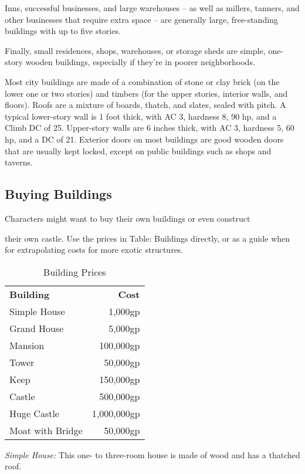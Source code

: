 Inns, successful businesses, and large warehouses -- as well as millers, tanners, 
and other businesses that require extra space -- are generally large, free-standing 
buildings with up to five stories. 

Finally, small residences, shops, warehouses, or storage sheds are simple, one-story 
wooden buildings, especially if they're in poorer neighborhoods.

Most city buildings are made of a combination of stone or clay brick (on the lower 
one or two stories) and timbers (for the upper stories, interior walls, and floors). 
Roofs are a mixture of boards, thatch, and slates, sealed with pitch. A typical 
lower-story wall is 1 foot thick, with AC 3, hardness 8, 90 hp, and a Climb DC 
of 25. Upper-story walls are 6 inches thick, with AC 3, hardness 5, 60 hp, and 
a  DC of 21. Exterior doors on most buildings are good wooden doors that are 
usually kept locked, except on public buildings such as shops and taverns.

\subsection{Buying Buildings}

Characters might want to buy their own buildings or even construct

their own castle. Use the prices in Table: Buildings directly, or as a guide when 
for extrapolating costs for more exotic structures.

\begin{table}[htb]
\caption{Building Prices}
\centering
\begin{tabular}{l r}
\textbf{Building} & \textbf{Cost}\\
Simple House & 1,000gp\\
Grand House & 5,000gp\\
Mansion & 100,000gp\\
Tower & 50,000gp\\
Keep & 150,000gp\\
Castle & 500,000gp\\
Huge Castle & 1,000,000gp\\
Moat with Bridge & 50,000gp\\
\end{tabular}
\end{table}

\textit{Simple House:} This one- to three-room house is made of wood and has a 
thatched roof.

